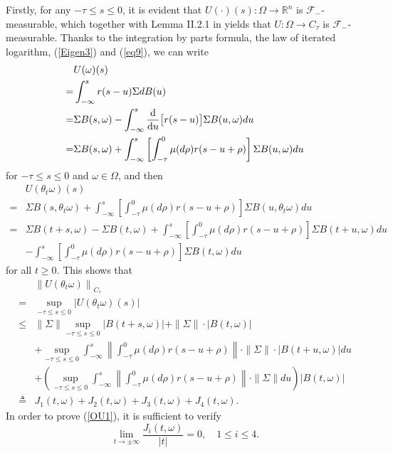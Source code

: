 \documentclass[preprint,12pt]{elsarticle}
\begin{document}
Firstly, for any $-\tau\leq s\leq0$, it is evident that $U(\cdot)(s):\Omega\rightarrow \mathbb{R}^{n}$ is $\mathscr{F}_-$-measurable, which together with Lemma II.2.1 in \cite{Mo} yields that $U:\Omega\rightarrow C_\tau$ is $\mathscr{F}_-$-measurable. Thanks to the integration by parts formula, the law of iterated logarithm, (\ref{Eigen3}) and (\ref{eq9}), we can write
\begin{align}\label{eq11}
&U(\omega)(s)\nonumber\\
=&\int_{-\infty}^{s}r(s-u)\Sigma dB(u)\nonumber\\
=&\Sigma B(s,\omega)-\int_{-\infty}^{s}\frac{\rm d}{{\rm d}u}\bigl[r(s-u)\bigr]\Sigma B(u,\omega)du\nonumber\\
=&\Sigma B(s,\omega)+\int_{-\infty}^{s}\left[\int_{-\tau}^0\mu(d\rho)r(s-u+\rho)\right]\Sigma B(u,\omega)du
\end{align}
for $-\tau\leq s\leq0$ and $\omega\in\Omega$, and then
\begin{align}\label{eq12}
&U(\theta_t\omega)(s)\nonumber\\
=&\Sigma B(s,\theta_t\omega)+\int_{-\infty}^{s}\left[\int_{-\tau}^0\mu(d\rho)r(s-u+\rho)\right]\Sigma B(u,\theta_t\omega)du\nonumber\\
=&\Sigma B(t+s,\omega)-\Sigma B(t,\omega)+\int_{-\infty}^{s}\left[\int_{-\tau}^0\mu(d\rho)r(s-u+\rho)\right]\Sigma B(t+u,\omega)du\nonumber\\
&-\int_{-\infty}^{s}\left[\int_{-\tau}^0\mu(d\rho)r(s-u+\rho)\right]\Sigma B(t,\omega)du
\end{align}
for all $t\geq0$. This shows that
\begin{align}\label{eq13}
&\left\|U(\theta_t\omega)\right\|_{C_\tau}\nonumber\\
=&\sup_{-\tau\leq s\leq0}\left|U(\theta_t\omega)(s)\right|\nonumber\\
\leq&\|\Sigma\|\sup_{-\tau\leq s\leq0}|B(t+s,\omega)|+\|\Sigma\|\cdot|B(t,\omega)|\nonumber\\
&+\sup_{-\tau\leq s\leq0}\int_{-\infty}^{s}\left\|\int_{-\tau}^0\mu(d\rho)r(s-u+\rho)\right\|\cdot\|\Sigma\|\cdot|B(t+u,\omega)|du\nonumber\\
&+\left(\sup_{-\tau\leq s\leq0}\int_{-\infty}^{s}\left\|\int_{-\tau}^0\mu(d\rho)r(s-u+\rho)\right\|\cdot\|\Sigma\|du\right)|B(t,\omega)|\nonumber\\
\triangleq&J_1(t,\omega)+J_2(t,\omega)+J_3(t,\omega)+J_4(t,\omega).
\end{align}
In order to prove (\ref{OU1}), it is sufficient to verify
\begin{equation}\label{eq14}
\lim_{t\rightarrow\pm\infty}\frac{J_i(t,\omega)}{|t|}=0,\quad 1\leq i\leq4.
\end{equation}
\end{document}
